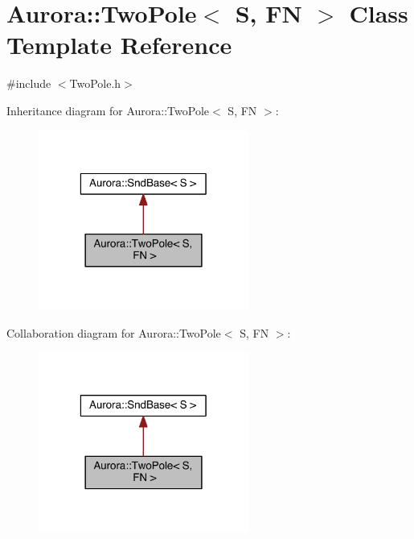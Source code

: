 \hypertarget{class_aurora_1_1_two_pole}{}\section{Aurora\+:\+:Two\+Pole$<$ S, FN $>$ Class Template Reference}
\label{class_aurora_1_1_two_pole}


{\ttfamily \#include $<$Two\+Pole.\+h$>$}



Inheritance diagram for Aurora\+:\+:Two\+Pole$<$ S, FN $>$\+:
\nopagebreak
\begin{figure}[H]
\begin{center}
\leavevmode
\includegraphics[width=196pt]{class_aurora_1_1_two_pole__inherit__graph}
\end{center}
\end{figure}


Collaboration diagram for Aurora\+:\+:Two\+Pole$<$ S, FN $>$\+:
\nopagebreak
\begin{figure}[H]
\begin{center}
\leavevmode
\includegraphics[width=196pt]{class_aurora_1_1_two_pole__coll__graph}
\end{center}
\end{figure}
